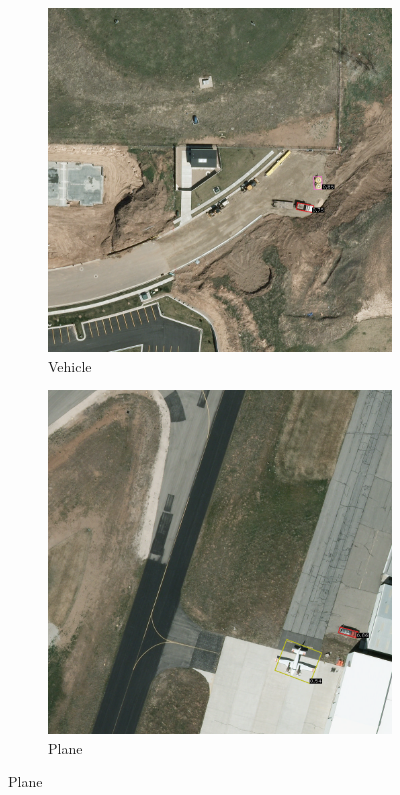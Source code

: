 \begin{figure}[h!]
    \begin{subfigure}[t]{0.38\textwidth}
        \centering
        \includegraphics[width=\linewidth]{images/015Results/01abb_vs_obb/comp_images/obb/427.png}
        \caption{Vehicle}
    \end{subfigure}
    \begin{subfigure}[t]{0.38\textwidth}
        \centering
        \includegraphics[width=\linewidth]{images/015Results/01abb_vs_obb/comp_images/obb/487.png}
        \caption{Plane}
    \end{subfigure}
    

\end{figure}
